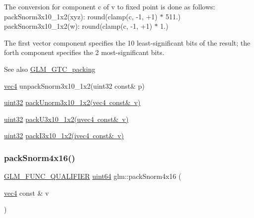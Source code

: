 The conversion for component c of v to fixed point is done as follows\+: pack\+Snorm3x10\+\_\+1x2(xyz)\+: round(clamp(c, -\/1, +1) $\ast$ 511.) pack\+Snorm3x10\+\_\+1x2(w)\+: round(clamp(c, -\/1, +1) $\ast$ 1.)

The first vector component specifies the 10 least-\/significant bits of the result; the forth component specifies the 2 most-\/significant bits.

\begin{DoxySeeAlso}{See also}
\mbox{\hyperlink{group__gtc__packing}{G\+L\+M\+\_\+\+G\+T\+C\+\_\+packing}} 

\mbox{\hyperlink{group__core__types_ga5881b1b022d7fd1b7218f5916532dd02}{vec4}} unpack\+Snorm3x10\+\_\+1x2(uint32 const\& p) 

\mbox{\hyperlink{group__gtc__type__precision_ga202b6a53c105fcb7e531f9b443518451}{uint32}} \mbox{\hyperlink{group__gtc__packing_ga2cf2d11b40bd48639110456fd74c2e33}{pack\+Unorm3x10\+\_\+1x2(vec4 const\& v)}} 

\mbox{\hyperlink{group__gtc__type__precision_ga202b6a53c105fcb7e531f9b443518451}{uint32}} \mbox{\hyperlink{group__gtc__packing_gaf656d8862628f96b20de7a36eaa1fe56}{pack\+U3x10\+\_\+1x2(uvec4 const\& v)}} 

\mbox{\hyperlink{group__gtc__type__precision_ga202b6a53c105fcb7e531f9b443518451}{uint32}} \mbox{\hyperlink{group__gtc__packing_ga032e18fa5bc5b8f3897104aeb2f1e195}{pack\+I3x10\+\_\+1x2(ivec4 const\& v)}} 
\end{DoxySeeAlso}
\mbox{\label{group__gtc__packing_ga9b237d7c66b7a71964e6d1f4dc06539f}} 
\subsubsection{\texorpdfstring{pack\+Snorm4x16()}{packSnorm4x16()}}
{\footnotesize\ttfamily \mbox{\hyperlink{setup_8hpp_a33fdea6f91c5f834105f7415e2a64407}{G\+L\+M\+\_\+\+F\+U\+N\+C\+\_\+\+Q\+U\+A\+L\+I\+F\+I\+ER}} \mbox{\hyperlink{group__gtc__type__precision_gae3632bf9b37da66233d78930dd06378a}{uint64}} glm\+::pack\+Snorm4x16 (\begin{DoxyParamCaption}\item[{\mbox{\hyperlink{group__core__types_ga5881b1b022d7fd1b7218f5916532dd02}{vec4}} const \&}]{v }\end{DoxyParamCaption})}

